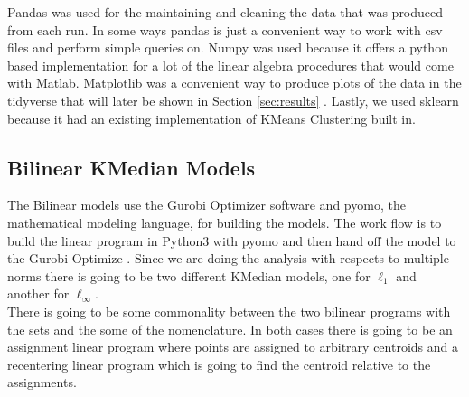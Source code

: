 \documentclass[a4paper,12pt]{article}
\numberwithin{equation}{section}
\begin{document}
Pandas was used for the maintaining and cleaning the data that was produced from each run. In some ways pandas is just a convenient way to work with csv files and perform simple queries on. Numpy was used because it offers a python based implementation for a lot of the linear algebra procedures that would come with Matlab.  Matplotlib was a convenient way to produce plots of the data in the tidyverse that will later be shown in Section \ref{sec:results} . Lastly, we used sklearn because it had an existing implementation of KMeans Clustering built in. 

\subsection{Bilinear KMedian Models}\label{sec:bilinear_imp}
The Bilinear models use the Gurobi Optimizer software and pyomo, the mathematical modeling language, for building the models. The work flow is to build the linear program in Python3 with pyomo and then hand off the model to the Gurobi Optimize . Since we are doing the analysis with respects to multiple norms there is going to be two different KMedian models, one for $\ell_1$ and another for $\ell_\infty$. \\

There is going to be some commonality between the two bilinear programs with the sets and the some of the nomenclature. In both cases there is going to be an assignment linear program where points are assigned to arbitrary centroids and a recentering linear program which is going to find the centroid relative to the assignments.
\end{document}
